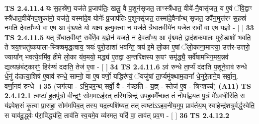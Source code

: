 \documentclass[17pt]{extarticle}
\begin{document}
                  \newline
                                \textbf{ TS 2.4.11.4} \newline
                  यः स॒हस्रे॑ण॒ यज॑ते प्र॒जाप॑तिः॒ खलु॒ वै प॒शून॑सृजत॒ ताꣳस्त्रै॑धात॒ वीये॑-नै॒वासृ॑जत॒ य ए॒वं ॅवि॒द्वाꣳ स्त्रै॑धात॒वीये॑नप॒शुका॑मो॒ यज॑ते॒ यस्मा॑दे॒व योनेः᳚ प्र॒जाप॑तिः प॒शूनसृ॑जत॒ तस्मा॑दे॒वैना᳚न्थ् सृजत॒ उपै॑न॒मुत्त॑रꣳ स॒हस्रं॑ नमति दे॒वता᳚भ्यो॒ वा ए॒ष आ वृ॑श्च्यते॒ यो य॒क्ष्य इत्यु॒क्त्वा न यज॑ते त्रैधात॒वीये॑न यजेत॒ सर्वो॒ वा ए॒ष य॒ज्ञो - [  ] \textbf{  33} \newline
                  \newline
                                \textbf{ TS 2.4.11.5} \newline
                  यत् त्रै॑धात॒वीयꣳ॒॒ सर्वे॑णै॒व य॒ज्ञेन॑ यजते॒ न दे॒वता᳚भ्य॒ आ वृ॑श्च्यते॒ द्वाद॑शकपालः पुरो॒डाशो॑ भवति॒ ते त्रय॒श्चतु॑ष्कपाला-स्त्रिष्षमृद्ध॒त्वाय॒ त्रयः॑ पुरो॒डाशा॑ भवन्ति॒ त्रय॑ इ॒मे लो॒का ए॒षां ॅलो॒काना॒माप्त्या॒ उत्त॑र-उत्तरो॒ ज्याया᳚न् भवत्ये॒वमि॑व॒ हीमे लो॒का य॑व॒मयो॒ मद्ध्य॑ ए॒तद्वा अ॒न्तरि॑क्षस्य रू॒पꣳ समृ॑द्ध्यै॒ सर्वे॑षामभिग॒मय॒न्नव॑ द्य॒त्यछ॑बंट्कारꣳ॒॒ हिर॑ण्यं ददाति॒ तेज॑ ए॒वा - [  ] \textbf{  34} \newline
                  \newline
                                \textbf{ TS 2.4.11.6} \newline
                  ऽव॑ रुन्धे ता॒र्प्यं द॑दाति प॒शूने॒वाव॑ रुन्धे धे॒नुं द॑दात्या॒शिष॑ ए॒वाव॑ रुन्धे॒ साम्नो॒ वा ए॒ष वर्णो॒ यद्धिर॑ण्यं॒ ॅयजु॑षां ता॒र्प्यमु॑क्थाम॒दानां᳚ धे॒नुरे॒ताने॒व सर्वा॒न्॒. वर्णा॒नव॑ रुन्धे ॥ \textbf{  35 } \newline
                  \newline
                      (जग॑त्या - ऽभि॒चर॒न्थ् सर्वो॒ वै - ग॑च्छति - य॒ज्ञ् - स्तेज॑ ए॒व - त्रिꣳ॒॒शच्च॑)  \textbf{(A11)} \newline \newline
                                        \textbf{ TS 2.4.12.1} \newline
                  त्वष्टा॑ ह॒तपु॑त्रो॒ वीन्द्रꣳ॒॒ सोम॒माऽह॑र॒त् तस्मि॒न्निन्द्र॑ उपह॒वमै᳚च्छत॒ तं नोपा᳚ह्वयत पु॒त्रं मे॑ऽवधी॒रिति॒ स य॑ज्ञ्वेश॒सं कृ॒त्वा प्रा॒सहा॒ सोम॑मपिब॒त् तस्य॒ यद॒त्यशि॑ष्यत॒ तत् त्वष्टा॑ऽऽहव॒नीय॒मुप॒ प्राव॑र्तय॒थ् स्वाहेन्द्र॑शत्रुर्वर्द्ध॒स्वेति॒ स याव॑दू॒र्द्ध्वः प॑रा॒विद्ध्य॑ति॒ ताव॑ति स्व॒यमे॒व व्य॑रमत॒ यदि॑ वा॒ ताव॑त् प्रव॒ण - [  ] \textbf{  36} \newline
                  \newline
                                \textbf{ TS 2.4.12.2} \newline
\end{document}
